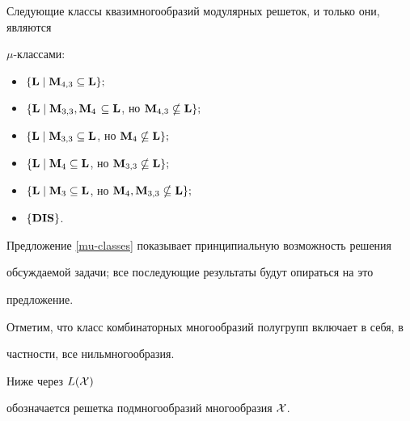 \begin{prop}


\label{mu-classes}


Следующие классы квазимногообразий модулярных решеток, и только они, являются


$\mu$-классами\/${:}$


\begin{itemize}


\item[1)] $\{\bold L\mid \bold M_{4,3}\subseteq\bold L\};$


\item[2)] $\{\bold L\mid \bold M_{3,3},\bold M_4$ $\subseteq\bold


L$, но $\bold M_{4,3}\nsubseteq\bold L\};$


\item[3)] $\{\bold L\mid \bold M_{3,3}\subseteq\bold L$, но $\bold


M_4\nsubseteq\bold L\};$


\item[4)] $\{\bold L\mid \bold M_4\subseteq\bold L$, но $\bold


M_{3,3}\nsubseteq\bold L\};$


\item[5)] $\{\bold L\mid \bold M_3\subseteq\bold L$, но $\bold


M_4,\bold M_{3,3}\nsubseteq\bold L\};$


\item[6)] $\{\bold{DIS}\}$.


\end{itemize}


\end{prop}





Предложение \ref{mu-classes} показывает принципиальную возможность решения


обсуждаемой задачи; все последующие результаты будут опираться на это


предложение.





Отметим, что класс комбинаторных многообразий полугрупп включает в себя, в


частности, все нильмногообразия.


Ниже через $L(\cal X)$


обозначается решетка подмногообразий многообразия $\cal X$.


